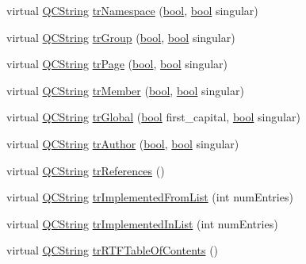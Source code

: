 \begin{DoxyCompactItemize}
virtual \hyperlink{class_q_c_string}{Q\+C\+String} \hyperlink{class_translator_german_acdc1e5e621a20175271eb4854c66ab33}{tr\+Namespace} (\hyperlink{qglobal_8h_a1062901a7428fdd9c7f180f5e01ea056}{bool}, \hyperlink{qglobal_8h_a1062901a7428fdd9c7f180f5e01ea056}{bool} singular)
\item 
virtual \hyperlink{class_q_c_string}{Q\+C\+String} \hyperlink{class_translator_german_acfb9fb7a0daff6079b7ecb712f74054b}{tr\+Group} (\hyperlink{qglobal_8h_a1062901a7428fdd9c7f180f5e01ea056}{bool}, \hyperlink{qglobal_8h_a1062901a7428fdd9c7f180f5e01ea056}{bool} singular)
\item 
virtual \hyperlink{class_q_c_string}{Q\+C\+String} \hyperlink{class_translator_german_a5bac945a0f8b91fb34667d0724f69093}{tr\+Page} (\hyperlink{qglobal_8h_a1062901a7428fdd9c7f180f5e01ea056}{bool}, \hyperlink{qglobal_8h_a1062901a7428fdd9c7f180f5e01ea056}{bool} singular)
\item 
virtual \hyperlink{class_q_c_string}{Q\+C\+String} \hyperlink{class_translator_german_ae5e008b742cf250fce802f080cd5d509}{tr\+Member} (\hyperlink{qglobal_8h_a1062901a7428fdd9c7f180f5e01ea056}{bool}, \hyperlink{qglobal_8h_a1062901a7428fdd9c7f180f5e01ea056}{bool} singular)
\item 
virtual \hyperlink{class_q_c_string}{Q\+C\+String} \hyperlink{class_translator_german_ac202e603ffb1afdfd0d2d2b817a9a5bc}{tr\+Global} (\hyperlink{qglobal_8h_a1062901a7428fdd9c7f180f5e01ea056}{bool} first\+\_\+capital, \hyperlink{qglobal_8h_a1062901a7428fdd9c7f180f5e01ea056}{bool} singular)
\item 
virtual \hyperlink{class_q_c_string}{Q\+C\+String} \hyperlink{class_translator_german_a32cc23772522eef38aeb62dc83fc917d}{tr\+Author} (\hyperlink{qglobal_8h_a1062901a7428fdd9c7f180f5e01ea056}{bool}, \hyperlink{qglobal_8h_a1062901a7428fdd9c7f180f5e01ea056}{bool} singular)
\item 
virtual \hyperlink{class_q_c_string}{Q\+C\+String} \hyperlink{class_translator_german_afa0c2c427bb4da28b214853d71ce3e7f}{tr\+References} ()
\item 
virtual \hyperlink{class_q_c_string}{Q\+C\+String} \hyperlink{class_translator_german_a0db6c86a748459f9eec496aac897dd9f}{tr\+Implemented\+From\+List} (int num\+Entries)
\item 
virtual \hyperlink{class_q_c_string}{Q\+C\+String} \hyperlink{class_translator_german_aacb18d80b7a94846088c6bfd14c88d50}{tr\+Implemented\+In\+List} (int num\+Entries)
\item 
virtual \hyperlink{class_q_c_string}{Q\+C\+String} \hyperlink{class_translator_german_a33054ea6ee086d41966dea119b6c4624}{tr\+R\+T\+F\+Table\+Of\+Contents} ()

\end{DoxyCompactItemize}
